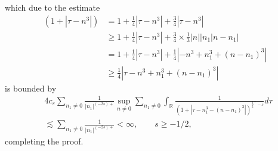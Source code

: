 \documentclass[12pt,reqno]{amsart}
\numberwithin{equation}{section}  %
\numberwithin{figure}{section}
\newcommand{\rr}{\mathbb{R}}
\newcommand{\ee}{\varepsilon}
\theoremstyle{plain}
\theoremstyle{definition}
\theoremstyle{remark}
\begin{document}
%
which due to the estimate
%
%
\begin{equation}
	\label{16g}
	\begin{split}
		(1 + | \tau - n^{3} |)
		& = 1 + \frac{1}{4}| \tau - n^{3} | + \frac{3}{4}| \tau - n^{3} |
		\\
		& \ge 1 + \frac{1}{4}| \tau - n^{3} | + \frac{3}{4} \times
		\frac{1}{3}| n | |n_1 | n - n_1 |
		\\
		& = 1 + \frac{1}{4}| \tau - n^{3} | + \frac{1}{4}| -n^3 + n_1^3 + (n -
		n_1)^3 |
		\\
		& \ge \frac{1}{4}| \tau -n^3 + n_1^3 + (n - n_1)^{3} |
	\end{split}
\end{equation}
%
%
is bounded by
%
%
\begin{equation}
	\label{15g}
	\begin{split}
		& 4 c_{\ee} \sum_{n_1 \neq 0} \frac{1}{|n_1|^{(-2s)+}} \sup_{n \neq 0} \sum_{n_1 \neq 0}\int_{\rr} \frac{1}{(1 +
		| \tau - n_{1}^{3} - (n - n_{1})^{3} |)^{\frac{3}{2}^- - \ee}} d \tau
		\\
		& \lesssim \sum_{n_1 \neq 0} \frac{1}{|n_{1}|^{(-2s)+}} < \infty, \qquad s \ge
		-1/2,
	\end{split}
\end{equation}
%
%
completing the proof. \qquad \qedsymbol
%
%
\end{document}
